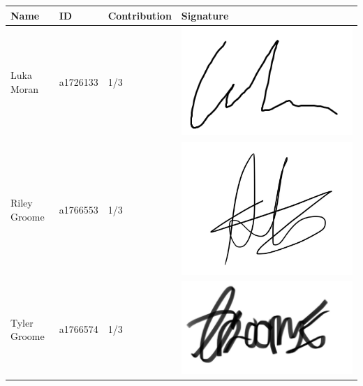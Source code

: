 \begin{xltabular}{\textwidth}{|M{4cm}|x|M{3cm}|x|}
\hline
\textbf{Name} & \textbf{ID} & \textbf{Contribution} & \textbf{Signature}
\\ \hline
Luka Moran & a1726133 & 1/3 & \includegraphics[scale=0.2]{images/luka_sig.png} \\
Riley Groome & a1766553 & 1/3 & \includegraphics[scale=0.06]{images/riley_sig.jpg} \\
Tyler Groome & a1766574 & 1/3 & \includegraphics[scale=0.04]{images/tyler_sig.jpg} \\
\hline
\end{xltabular}